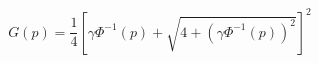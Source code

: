 

\[
G(p) = \frac{1} {4} \left[\gamma \Phi^{-1}(p) + \sqrt{4 + (\gamma \Phi^{-1}(p))^{2}}\right]^{2}
\]



